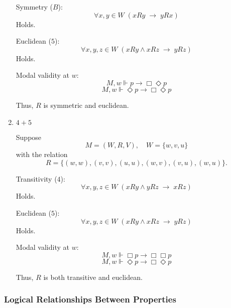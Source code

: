 \documentclass[12pt,a4paper,openany]{article}
\begin{document}
\begin{enumerate}
    Symmetry ($B$):
    $$\forall x,y \in W \; (xRy \;\to\; yRx)$$
    Holds.
    
    Euclidean ($5$):
    $$\forall x,y,z \in W \; (xRy \wedge xRz \;\to\; yRz)$$
    Holds.
    
    Modal validity at $w$:
    $$M,w \Vdash p \to \Box \Diamond p$$
    $$M,w \Vdash \Diamond p \to \Box \Diamond p$$
    
    Thus, $R$ is symmetric and euclidean.
    
    \item \textbf{$4+5$}
    
    Suppose
    $$M = (W, R, V), \quad W = \{w, v, u\}$$
    with the relation
    $$R = \{(w,w), (v,v), (u,u), (w,v), (v,u), (w,u)\}.$$
    
    Transitivity ($4$):
    $$\forall x,y,z \in W \; (xRy \wedge yRz \;\to\; xRz)$$
    Holds.
    
    Euclidean ($5$):
    $$\forall x,y,z \in W \; (xRy \wedge xRz \;\to\; yRz)$$
    Holds.
    
    Modal validity at $w$:
    $$M,w \Vdash \Box p \to \Box \Box p$$
    $$M,w \Vdash \Diamond p \to \Box \Diamond p$$
    
    Thus, $R$ is both transitive and euclidean.
\end{enumerate}

\subsubsection{Logical Relationships Between Properties}
\end{document}
